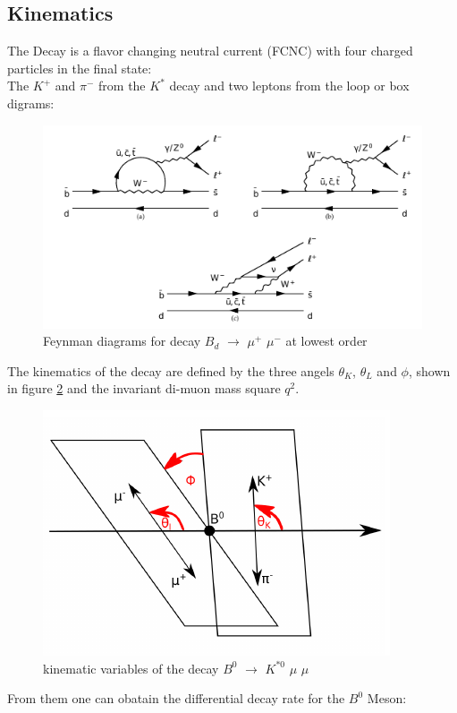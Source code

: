 \documentclass[english]{uzhpub}
\begin{document}
\subsection{Kinematics}
The Decay is a flavor changing neutral current (FCNC) with four charged particles in the final state: \\
The $K^+$ and $\pi^-$ from the $K^{*}$ decay and two leptons from the loop or box digrams:
\begin{figure}[H]
 \centering
 \includegraphics[width=0.8\linewidth]{KstarFeynman}
 \caption{Feynman diagrams for decay $B_d$ $\rightarrow$ $\mu^+$ $\mu^-$ at lowest order}
 \label{fig:Feynman}
\end{figure}
The kinematics of the decay are defined by the three angels $\theta_K$, $\theta_L$ and $\phi$, shown in figure \ref{fig:angels} and the invariant di-muon mass square $q^2$.
\begin{figure}[H]
 \centering
 \includegraphics[width=0.6\linewidth]{angels}
 \caption{kinematic variables of the decay $B^0$ $\rightarrow$ $K^{*0}$ $\mu$ $\mu$}
 \label{fig:angels}
\end{figure}
From them one can obatain the differential decay rate for the $B^0$ Meson:
\end{document}
